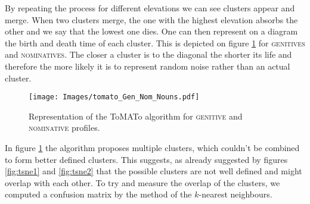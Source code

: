 \documentclass[11pt]{article}
\newcommand{\scsf}[1]{\textsc{\textsf{#1}}} %
\begin{document}
By repeating the process for different elevations we can see clusters appear and merge.
When two clusters merge, the one with the highest elevation absorbs the other and we say that the lowest one dies.
One can then represent on a diagram the birth and death time of each cluster.
This is depicted on figure \ref{fig:tomato1} for \scsf{genitives} and \scsf{nominatives}.
The closer a cluster is to the diagonal the shorter its life and therefore the more likely it is to represent random noise rather than an actual cluster.

\begin{figure}[h]
  \centering
  \vspace*{-12pt}
  \texttt{[image: Images/tomato\_Gen\_Nom\_Nouns.pdf]}
  \caption{Representation of the ToMATo algorithm for \scsf{genitive} and \scsf{nominative} profiles.}
  \label{fig:tomato1}
\end{figure}

In figure \ref{fig:tomato1} the algorithm proposes multiple clusters, which couldn't be combined to form better defined clusters.
This suggests, as already suggested by figures \ref{fig:tsne1} and \ref{fig:tsne2} that the possible clusters are not well defined and might overlap with each other.
To try and measure the overlap of the clusters, we computed a confusion matrix by the method of the $k$-nearest neighbours.
\end{document}
